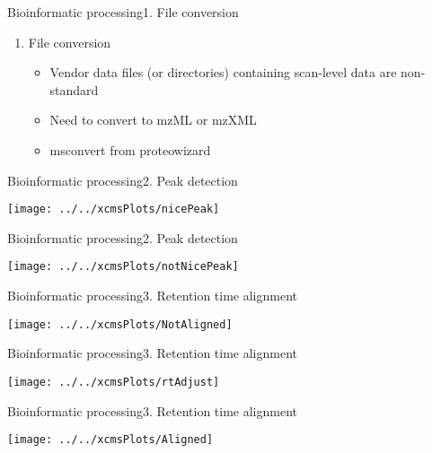 \documentclass[xcolor=dvipsnames]{beamer}
\begin{document}
\begin{frame}{Bioinformatic processing}{1. File conversion}
\vspace{-10pt}
	\begin{enumerate}
 [default]
		\item File conversion
		\begin{itemize}
			\item Vendor data files (or directories) containing scan-level data are non-standard
			\item Need to convert to mzML or mzXML
			\item msconvert from proteowizard
		\end{itemize}
	\end{enumerate}
\end{frame}

\begin{frame}{Bioinformatic processing}{2. Peak detection}
\vspace{-10pt}
\begin{center}
	\texttt{[image: ../../xcmsPlots/nicePeak]}
\end{center}
\end{frame}

\begin{frame}{Bioinformatic processing}{2. Peak detection}
\vspace{-10pt}
\begin{center}
	\texttt{[image: ../../xcmsPlots/notNicePeak]}
\end{center}
\end{frame}

\begin{frame}{Bioinformatic processing}{3. Retention time alignment}
\vspace{-10pt}
\begin{center}
	\texttt{[image: ../../xcmsPlots/NotAligned]}
\end{center}
\end{frame}

\begin{frame}{Bioinformatic processing}{3. Retention time alignment}
\vspace{-14pt}
\begin{center}
\texttt{[image: ../../xcmsPlots/rtAdjust]}
\end{center}
\end{frame}

\begin{frame}{Bioinformatic processing}{3. Retention time alignment}
\vspace{-10pt}
\begin{center}
	\texttt{[image: ../../xcmsPlots/Aligned]}
\end{center}
\end{frame}
\end{document}
